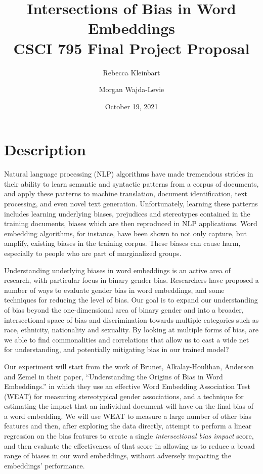 \documentclass{article}
\title{Intersections of Bias in Word Embeddings\\
    \Large{CSCI 795 Final Project Proposal}}
\date{October 19, 2021}
\author{Rebecca Kleinbart \and Morgan Wajda-Levie}
\begin{document}
\maketitle

\section{Description}

Natural language processing (NLP) algorithms have made tremendous strides in
their ability to learn semantic and syntactic patterns from a corpus of
documents, and apply these patterns to machine translation, document
identification, text processing, and even novel text generation.
Unfortunately, learning these patterns includes learning underlying
biases, prejudices and stereotypes contained in the training documents,
biases which are then reproduced in NLP applications. Word embedding
algorithms, for instance, have been shown to not only capture, but
amplify, existing biases in the training corpus. These biases can cause
harm, especially to people who are part of marginalized groups.

Understanding underlying biases in word embeddings is an active area of
research, with particular focus in binary gender bias. Researchers have
proposed a number of ways to evaluate gender bias in word embeddings,
and some techniques for reducing the level of bias. Our goal is to
expand our understanding of bias beyond the one-dimensional area of
binary gender and into a broader, intersectional space of bias and
discrimination towards multiple categories such as race, ethnicity,
nationality and sexuality. By looking at multiple forms of bias, are we
able to find commonalities and correlations that allow us to cast a wide
net for understanding, and potentially mitigating bias in our trained
model?

Our experiment will start from the work of Brunet, Alkalay-Houlihan,
Anderson and Zemel in their paper, ``Understanding the Origins of Bias
in Word Embeddings.'' in which they use an effective Word Embedding
Association Test (WEAT) for measuring stereotypical gender associations,
and a technique for estimating the impact that an individual document
will have on the final bias of a word embedding. We will use WEAT to
measure a large number of other bias features and then, after exploring
the data directly, attempt to perform a linear regression on the bias
features to create a single \emph{intersectional bias impact} score, and
then evaluate the effectiveness of that score in allowing us to reduce
a broad range of biases in our word embeddings, without adversely
impacting the embeddings' performance.
\end{document}
